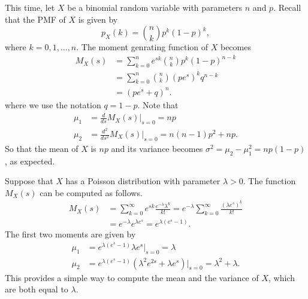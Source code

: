 \begin{example}
This time, let $X$ be a binomial random variable with parameters $n$ and $p$.
Recall that the PMF of $X$ is given by
\begin{equation*}
p_X(k) = \binom{n}{k} p^k (1 - p)^k,
\end{equation*}
where $k = 0, 1, \ldots, n$.
The moment genrating function of $X$ becomes
\begin{equation*}
\begin{split}
M_X(s) &= \sum_{k = 0}^n e^{sk} \binom{n}{k} p^k (1-p)^{n - k} \\
&= \sum_{k = 0}^n \binom{n}{k} (pe^s)^k q^{n - k} \\
&= (pe^s + q)^n .
\end{split}
\end{equation*}
where we use the notation $q = 1 - p$.
Note that
\begin{align*}
\mu_1 &= \frac{d}{ds} M_X (s) \Big|_{s = 0} = np \\
\mu_2 &= \frac{d^2}{ds^2} M_X (s) \Big|_{s = 0}
= n(n-1)p^2 + np .
\end{align*}
So that the mean of $X$ is $np$ and its variance becomes $\sigma^2 = \mu_2 - \mu_1^2 = np(1 - p)$, as expected.
\end{example}

\begin{example}
Suppose that $X$ has a Poisson distribution with parameter $\lambda > 0$.
The function $M_X(s)$ can be computed as follows.
\begin{equation*}
\begin{split}
M_X(s) &= \sum_{k = 0}^\infty e^{sk} \frac{e^{-\lambda}\lambda^k}{k!}
= e^{-\lambda} \sum_{k = 0}^\infty \frac{(\lambda e^s)^k}{k!} \\
&= e^{-\lambda} e^{\lambda e^s} = e^{\lambda(e^s - 1)} .
\end{split}
\end{equation*}
The first two moments are given by
\begin{align*}
\mu_1 &= e^{\lambda(e^s - 1)} \lambda e^s \Big|_{s = 0} = \lambda \\
\mu_2 &= e^{\lambda(e^s - 1)} \left( \lambda^2 e^{2s} + \lambda e^s \right)
\Big|_{s = 0} = \lambda^2 + \lambda .
\end{align*} 
This provides a simple way to compute the mean and the variance of $X$, which are both equal to $\lambda$.
\end{example}



